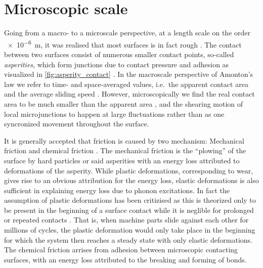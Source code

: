 




\section{Microscopic scale}\label{sec:microscale}
Going from a macro- to a microscale perspective, at a length scale on the order
\SI{e-6}{m}, it was realised that most surfaces is in fact rough
\cite{mo_friction_2009}. The contact between two surfaces consist of numerous
smaller contact points, so-called \textit{asperities}, which form junctions due to contact pressure and adhesion as visualized in \cref{fig:asperity_contact} \cite{kim_nano-scale_2009}. In the macroscale perspective of Amonton's law we refer to time- and space-averaged values, i.e.\ the apparent contact area and the average
sliding speed \cite{gao_frictional_2004}. However, microscopically we find the
real contact area to be much smaller than the apparent area \cite{kim_nano-scale_2009}, and the shearing motion of local microjunctions to happen at large fluctuations rather than as one syncronized movement throughout the surface. 

It is generally accepted that friction is caused by two mechanism: Mechanical
friction and chemical friction \cite{kim_nano-scale_2009}. The mechanical
friction is the ``plowing'' of the surface by hard particles or said asperities
with an energy loss attributed to deformations of the asperity. While plastic
deformations, corresponding to wear, gives rise to an obvious attribution for
the energy loss, elastic deformations is also sufficient in explaining energy
loss due to phonon excitations. In fact the assumption of plastic deformations
has been critizised as this is theorized only to be present in the beginning of
a surface contact while it is neglible for prolonged or repeated contacts
\cite{CARBONE20082555}. That is, when machine parts slide against each other for
millions of cycles, the plastic deformation would only take place in the beginning for which the system then reaches a steady state with only elastic deformations.
The chemical friction arrises from adhesion between microscopic contacting
surfaces, with an energy loss attributed to the breaking and forming of bonds. 



